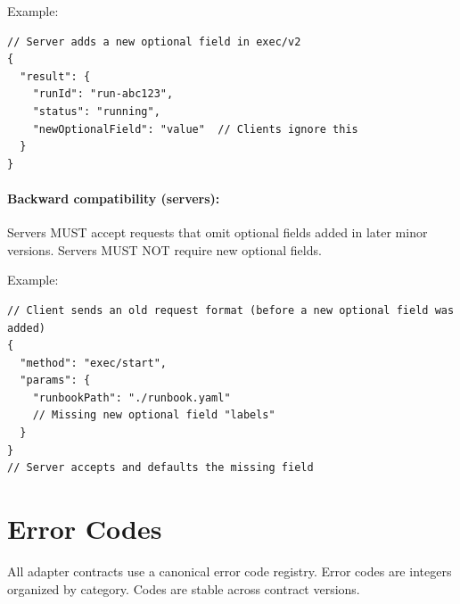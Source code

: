 Example:

\begin{verbatim}
// Server adds a new optional field in exec/v2
{
  "result": {
    "runId": "run-abc123",
    "status": "running",
    "newOptionalField": "value"  // Clients ignore this
  }
}
\end{verbatim}

\paragraph{Backward compatibility (servers):}

Servers MUST accept requests that omit optional fields added in later minor
versions.  Servers MUST NOT require new optional fields.

Example:

\begin{verbatim}
// Client sends an old request format (before a new optional field was added)
{
  "method": "exec/start",
  "params": {
    "runbookPath": "./runbook.yaml"
    // Missing new optional field "labels"
  }
}
// Server accepts and defaults the missing field
\end{verbatim}

\section{Error Codes}
\label{sec:error-codes}

All adapter contracts use a canonical error code registry.  Error codes are
integers organized by category.  Codes are stable across contract versions.

